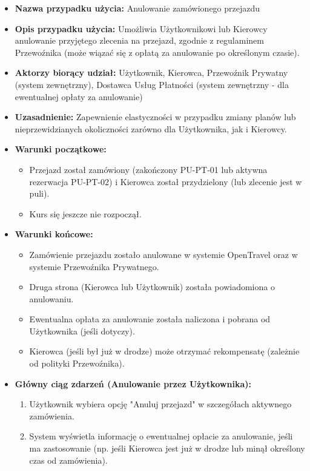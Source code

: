 \documentclass[a4paper,12pt]{article}
\begin{document}
\begin{itemize}
    \item \textbf{Nazwa przypadku użycia:} Anulowanie zamówionego przejazdu
    \item \textbf{Opis przypadku użycia:} Umożliwia Użytkownikowi lub Kierowcy anulowanie przyjętego zlecenia na przejazd, zgodnie z regulaminem Przewoźnika (może wiązać się z opłatą za anulowanie po określonym czasie).
    \item \textbf{Aktorzy biorący udział:} Użytkownik, Kierowca, Przewoźnik Prywatny (system zewnętrzny), Dostawca Usług Płatności (system zewnętrzny - dla ewentualnej opłaty za anulowanie)
    \item \textbf{Uzasadnienie:} Zapewnienie elastyczności w przypadku zmiany planów lub nieprzewidzianych okoliczności zarówno dla Użytkownika, jak i Kierowcy.
    \item \textbf{Warunki początkowe:}
        \begin{itemize}
            \item Przejazd został zamówiony (zakończony PU-PT-01 lub aktywna rezerwacja PU-PT-02) i Kierowca został przydzielony (lub zlecenie jest w puli).
            \item Kurs się jeszcze nie rozpoczął.
        \end{itemize}
    \item \textbf{Warunki końcowe:}
        \begin{itemize}
            \item Zamówienie przejazdu zostało anulowane w systemie OpenTravel oraz w systemie Przewoźnika Prywatnego.
            \item Druga strona (Kierowca lub Użytkownik) została powiadomiona o anulowaniu.
            \item Ewentualna opłata za anulowanie została naliczona i pobrana od Użytkownika (jeśli dotyczy).
            \item Kierowca (jeśli był już w drodze) może otrzymać rekompensatę (zależnie od polityki Przewoźnika).
        \end{itemize}
    \item \textbf{Główny ciąg zdarzeń (Anulowanie przez Użytkownika):}
        \begin{enumerate}
            \item Użytkownik wybiera opcję "Anuluj przejazd" w szczegółach aktywnego zamówienia.
            \item System wyświetla informację o ewentualnej opłacie za anulowanie, jeśli ma zastosowanie (np. jeśli Kierowca jest już w drodze lub minął określony czas od zamówienia).

\end{enumerate}
\end{itemize}
\end{document}
